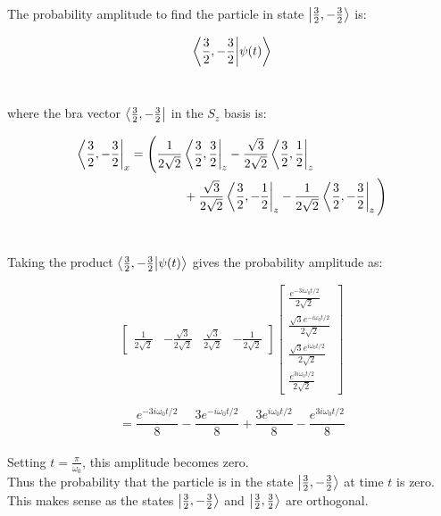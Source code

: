 \documentclass[9pt]{extarticle}
\begin{document}
\begin{multicols*}{2}
The probability amplitude to find the particle in state $\ket{\frac 32, -\frac 32}$ is:

$$\bra{\frac 32, -\frac 32}\ket{\psi(t)}$$ \ 

where the bra vector $\bra{\frac 32, -\frac 32}$ in the $S_z$ basis is:

$$
\begin{aligned}
	\bra{\frac 32, -\frac 32}_x &= \Bigg( \frac{1}{2\sqrt 2} \bra{\frac 32, \frac 32}_z - \frac{\sqrt 3}{2\sqrt 2} \bra{\frac 32, \frac 12}_z \\ 
	&\hspace{1.5cm}+ \frac{\sqrt 3}{2\sqrt 2} \bra{\frac 32, -\frac 12}_z - \frac{1}{2\sqrt 2}\bra{\frac 32, -\frac 32}_z \Bigg)
\end{aligned}
$$ \ 

Taking the product $\bra{\frac 32, -\frac 32}\ket{\psi(t)}$ gives the probability amplitude as:

$$
\begin{bmatrix}
	\frac{1}{2\sqrt 2}  & -\frac{\sqrt 3}{2\sqrt 2} & \frac{\sqrt 3}{2\sqrt 2} & -\frac{1}{2\sqrt 2}  
\end{bmatrix}
\begin{bmatrix}
	\frac{e^{-3i \omega_0 t / 2}}{2\sqrt 2} \\ 
	\frac{\sqrt 3 e^{-i \omega_0 t / 2}}{2\sqrt 2} \\ 
	\frac{\sqrt 3 e^{i \omega_0 t / 2}}{2\sqrt 2} \\ 	
	\frac{e^{3i \omega_0 t / 2}}{2\sqrt 2}
\end{bmatrix}
$$

$$= \frac{e^{-3i \omega_0 t / 2}}{8} - \frac{3e^{-i \omega_0 t / 2}}{8} + \frac{3e^{i \omega_0 t / 2}}{8} - \frac{e^{3i \omega_0 t / 2}}{8}$$ \\ 
 
Setting $t = \frac{\pi}{\omega_0}$, this amplitude becomes zero. \\ 

Thus the probability that the particle is in the state $\ket{\frac 32, -\frac 32}$ at time $t$ is zero. This makes sense as the states $\ket{\frac 32, -\frac 32}$ and $\ket{\frac 32, \frac 32}$ are orthogonal.  
















\end{multicols*}
\end{document}
